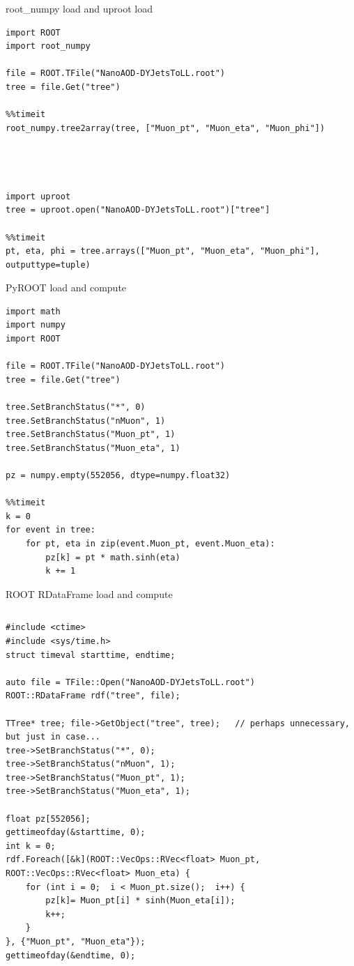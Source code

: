 \documentclass[aspectratio=169]{beamer}
\begin{document}
\begin{frame}[fragile]{root\_numpy load and uproot load}
\scriptsize
\begin{verbatim}
import ROOT
import root_numpy

file = ROOT.TFile("NanoAOD-DYJetsToLL.root")
tree = file.Get("tree")

%%timeit
root_numpy.tree2array(tree, ["Muon_pt", "Muon_eta", "Muon_phi"])




import uproot
tree = uproot.open("NanoAOD-DYJetsToLL.root")["tree"]

%%timeit
pt, eta, phi = tree.arrays(["Muon_pt", "Muon_eta", "Muon_phi"], outputtype=tuple)
\end{verbatim}
\end{frame}

\begin{frame}[fragile]{PyROOT load and compute}
\scriptsize
\begin{verbatim}
import math
import numpy
import ROOT

file = ROOT.TFile("NanoAOD-DYJetsToLL.root")
tree = file.Get("tree")

tree.SetBranchStatus("*", 0)
tree.SetBranchStatus("nMuon", 1)
tree.SetBranchStatus("Muon_pt", 1)
tree.SetBranchStatus("Muon_eta", 1)

pz = numpy.empty(552056, dtype=numpy.float32)

%%timeit
k = 0
for event in tree:
    for pt, eta in zip(event.Muon_pt, event.Muon_eta):
        pz[k] = pt * math.sinh(eta)
        k += 1
\end{verbatim}
\end{frame}

\begin{frame}[fragile]{ROOT RDataFrame load and compute}
\vspace{0.1 cm}
\scriptsize
\begin{columns}
\begin{verbatim}
#include <ctime>
#include <sys/time.h>
struct timeval starttime, endtime;

auto file = TFile::Open("NanoAOD-DYJetsToLL.root")
ROOT::RDataFrame rdf("tree", file);

TTree* tree; file->GetObject("tree", tree);   // perhaps unnecessary, but just in case...
tree->SetBranchStatus("*", 0);
tree->SetBranchStatus("nMuon", 1);
tree->SetBranchStatus("Muon_pt", 1);
tree->SetBranchStatus("Muon_eta", 1);

float pz[552056];
gettimeofday(&starttime, 0);
int k = 0;
rdf.Foreach([&k](ROOT::VecOps::RVec<float> Muon_pt, ROOT::VecOps::RVec<float> Muon_eta) {
    for (int i = 0;  i < Muon_pt.size();  i++) {
        pz[k]= Muon_pt[i] * sinh(Muon_eta[i]);
        k++;
    }
}, {"Muon_pt", "Muon_eta"});
gettimeofday(&endtime, 0);
\end{verbatim}
\end{columns}
\end{frame}
\end{document}
